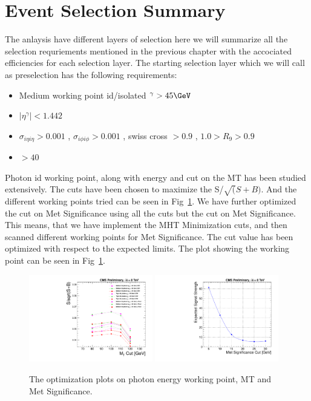 \section{Event Selection Summary}

The anlaysis have different layers of selection here we will summarize all the selection requriements mentioned in the previous chapter with the accociated efficiencies for each selection layer. The starting selection layer which we will call as preselection has the following requirements:

\begin{itemize}
\item Medium working point id/isolated \et$^{\gamma} > 45 \GeV $
\item $|\eta^{\gamma}| < 1.442$
\item $\sigma_{i{\eta}i{\eta}} > 0.001$ , $\sigma_{i{\phi}i{\phi}} > 0.001$ , swiss cross $> 0.9$ , $ 1.0 > R_{9} > 0.9$
\item \met$ > 40 $
\end{itemize}

Photon id working point, along with energy and cut on the MT has been studied extensively. The cuts have been chosen to maximize the S/$\sqrt(S+B)$. And the different working points tried can be seen in Fig~\ref{fig:optimize}. We have further optimized the cut on Met Significance using all the cuts but the cut on Met Significance. This means, that we have implement the MHT Minimization cuts, and then scanned different working points for Met Significance. The cut value has been optimized with respect to the expected limits. The plot showing the working point can be seen in Fig~\ref{fig:optimize}.

\begin{figure}[htb]
  \begin{center}
    \includegraphics[width=0.48\textwidth,angle=0]{analysis_figs/photon_optimize}\hfill
     \includegraphics[width=0.48\textwidth,angle=0]{analysis_figs/metsig_optimize.pdf}\hfill
    \caption{The optimization plots on photon energy working point, MT and Met Significance.}
  \end{center}
  \label{fig:optimize}
\end{figure}

